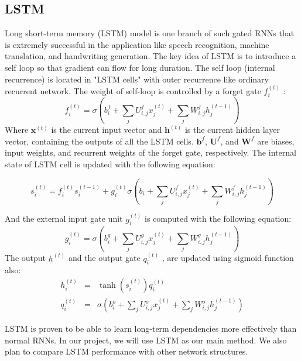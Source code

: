 \subsection{LSTM}
Long short-term memory (LSTM) model \cite{hochreiter1997lstm} is one branch of such gated RNNs that is extremely successful in the application like speech recognition, machine translation, and handwriting generation. 
%
The key idea of LSTM is to introduce a self loop so that gradient can flow for long duration. The self loop (internal recurrence) is located in "LSTM cells" with outer recurrence like ordinary recurrent network. The weight of self-loop is controlled by a forget gate \(f_i^{(t)}\)
:
\[f_i^{(t)} = \sigma (b_i^f + \sum_{j}U_{i,j}^f x_j^{(t)} +\sum_{j}W_{i,j}^f h_j^{(t-1)} ) \]
Where \(\boldsymbol{x}^{(t)}\) is the current input vector and \(\boldsymbol{h}^{(t)}\) is the current hidden layer vector, containing the outputs of all the LSTM cells. \(\boldsymbol{b}^f\), \(\boldsymbol{U}^f\), and \(\boldsymbol{W}^f\) are biases, input weights, and recurrent weights of the forget gate, respectively. The internal state of LSTM cell is updated with the following equation:
\begin{small}
\[s_i^{(t)} = f_i^{(t)}s_i^{(t-1)}+g_i^{(t)}\sigma(b_i + \sum_{j}U_{i,j}^f x_j^{(t)} +\sum_{j}W_{i,j}^f h_j^{(t-1)} )\]
\end{small}
And the external input gate unit 
\(g_i^{(t)} \)
is computed with the following equation:
\[g_i^{(t)} = \sigma (b_i^g + \sum_{j}U_{i,j}^g x_j^{(t)} +\sum_{j}W_{i,j}^g h_j^{(t-1)} ) \]
The output 
\(h^{(t)}\)
and the output gate 
\(q_i^{(t)}\)
, are updated using sigmoid function also:
\begin{eqnarray*}
h_i^{(t)} &=& \tanh (s_i^{(t)})q_i^{(t)}\\
q_i^{(t)} &=& \sigma (b_i^o + \sum_{j}U_{i,j}^o x_j^{(t)} +\sum_{j}W_{i,j}^o h_j^{(t-1)} )
\end{eqnarray*}

LSTM is proven to be able to learn long-term dependencies more effectively than normal RNNs. In our project, we will use LSTM as our main method. We also plan to compare LSTM performance with other network structures.